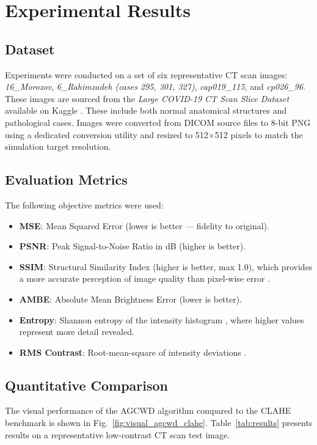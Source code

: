 \documentclass[conference]{IEEEtran}
\begin{document}
\section{Experimental Results}
\label{sec:results}

\subsection{Dataset}
Experiments were conducted on a set of six representative CT scan images: \textit{16\_Morozov}, \textit{6\_Rahimzadeh (cases 295, 301, 327)}, \textit{cap019\_115}, and \textit{cp026\_96}. These images are sourced from the \textit{Large COVID-19 CT Scan Slice Dataset} available on Kaggle \cite{kaggle_covid}. These include both normal anatomical structures and pathological cases. Images were converted from DICOM source files to 8-bit PNG using a dedicated conversion utility and resized to 512$\times$512 pixels to match the simulation target resolution.

\subsection{Evaluation Metrics}
The following objective metrics were used:
\begin{itemize}
  \item \textbf{MSE}: Mean Squared Error (lower is better — fidelity to original).
  \item \textbf{PSNR}: Peak Signal-to-Noise Ratio in dB (higher is better).
  \item \textbf{SSIM}: Structural Similarity Index (higher is better, max 1.0), which provides a more accurate perception of image quality than pixel-wise error \cite{ref7}.
  \item \textbf{AMBE}: Absolute Mean Brightness Error (lower is better).
  \item \textbf{Entropy}: Shannon entropy of the intensity histogram \cite{ref6}, where higher values represent more detail revealed.
  \item \textbf{RMS Contrast}: Root-mean-square of intensity deviations \cite{ref8}.
\end{itemize}

\subsection{Quantitative Comparison}

The visual performance of the AGCWD algorithm compared to the CLAHE benchmark is shown in Fig.~\ref{fig:visual_agcwd_clahe}. Table~\ref{tab:results} presents results on a representative low-contrast CT scan test image.
\end{document}
